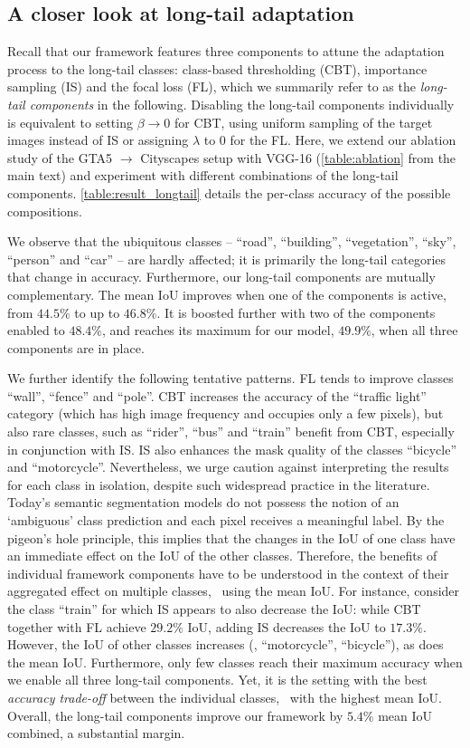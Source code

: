 
\subsection{A closer look at long-tail adaptation}
Recall that our framework features three components to attune the adaptation process to the long-tail classes: class-based thresholding (CBT), importance sampling (IS) and the focal loss (FL), which we summarily refer to as the \emph{long-tail components} in the following.
Disabling the long-tail components individually is equivalent to setting $\beta \rightarrow 0$ for CBT, using uniform sampling of the target images instead of IS or assigning $\lambda$ to \num{0} for the FL.
Here, we extend our ablation study of the GTA5 $\rightarrow$ Cityscapes setup with VGG-16 (\cf \cref{table:ablation} from the main text) and experiment with different combinations of the long-tail components.
\cref{table:result_longtail} details the per-class accuracy of the possible compositions.

We observe that the ubiquitous classes -- ``road'', ``building'', ``vegetation'', ``sky'', ``person'' and ``car'' -- are hardly affected;
it is primarily the long-tail categories that change in accuracy.
Furthermore, our long-tail components are mutually complementary.
The mean IoU improves when one of the components is active, from $44.5\%$ to up to $46.8\%$.
It is boosted further with two of the components enabled to $48.4\%$, and reaches its maximum for our model, $49.9\%$, when all three components are in place.

We further identify the following tentative patterns.
FL tends to improve classes ``wall'', ``fence'' and ``pole''.
CBT increases the accuracy of the ``traffic light'' category (which has high image frequency and occupies only a few pixels), but also rare classes, such as ``rider'', ``bus'' and ``train'' benefit from CBT, especially in conjunction with IS.
IS also enhances the mask quality of the classes ``bicycle'' and ``motorcycle''.
Nevertheless, we urge caution against interpreting the results for each class in isolation, despite such widespread practice in the literature.
Today's semantic segmentation models do not possess the notion of an `ambiguous' class prediction and each pixel receives a meaningful label.
By the pigeon's hole principle, this implies that the changes in the IoU of one class have an immediate effect on the IoU of the other classes.
Therefore, the benefits of individual framework components have to be understood in the context of their aggregated effect on multiple classes, \eg~using the mean IoU.
For instance, consider the class ``train'' for which IS appears to also decrease the IoU: while CBT together with FL achieve $29.2\%$ IoU, adding IS decreases the IoU to $17.3\%$.
However, the IoU of other classes increases (\eg, ``motorcycle'', ``bicycle''), as does the mean IoU.
Furthermore, only few classes reach their maximum accuracy when we enable all three long-tail components.
Yet, it is the setting with the best \emph{accuracy trade-off} between the individual classes, \ie~with the highest mean IoU.
Overall, the long-tail components improve our framework by $5.4\%$ mean IoU combined, a substantial margin.

